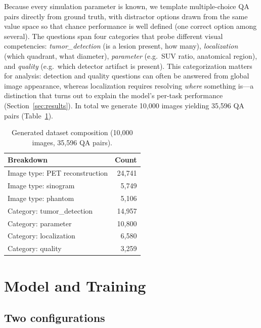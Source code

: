 \documentclass[11pt]{article}
\begin{document}
Because every simulation parameter is known, we template multiple-choice QA pairs
directly from ground truth, with distractor options drawn from the same value
space so that chance performance is well defined (one correct option among
several). The questions span four categories that probe different visual
competencies: \emph{tumor\_detection} (is a lesion present, how many),
\emph{localization} (which quadrant, what diameter), \emph{parameter} (e.g.\ SUV
ratio, anatomical region), and \emph{quality} (e.g.\ which detector artifact is
present). This categorization matters for analysis: detection and quality
questions can often be answered from global image appearance, whereas
localization requires resolving \emph{where} something is---a distinction that
turns out to explain the model's per-task performance
(Section~\ref{sec:results}). In total we generate 10{,}000 images yielding
35{,}596 QA pairs (Table~\ref{tab:data}).

\begin{table}[t]
\centering
\caption{Generated dataset composition (10{,}000 images, 35{,}596 QA pairs).}
\label{tab:data}
\begin{tabular}{lr}
\toprule
\textbf{Breakdown} & \textbf{Count} \\
\midrule
Image type: PET reconstruction & 24{,}741 \\
Image type: sinogram           & 5{,}749 \\
Image type: phantom            & 5{,}106 \\
\midrule
Category: tumor\_detection     & 14{,}957 \\
Category: parameter            & 10{,}800 \\
Category: localization         & 6{,}580 \\
Category: quality              & 3{,}259 \\
\bottomrule
\end{tabular}
\end{table}

\section{Model and Training}
\label{sec:model}

\subsection{Two configurations}
\end{document}

